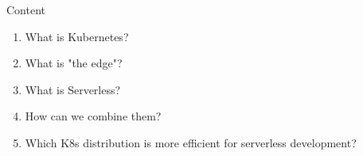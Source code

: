 \begin{frame}{Content}

\begin{enumerate}
    \item<1-> What is Kubernetes?
    \item<2-> What is "the edge"?
    \item<3-> What is Serverless?
    \item<4-> How can we combine them?
    \item<5-> Which K8s distribution is more efficient for serverless development?
\end{enumerate}

\end{frame}
